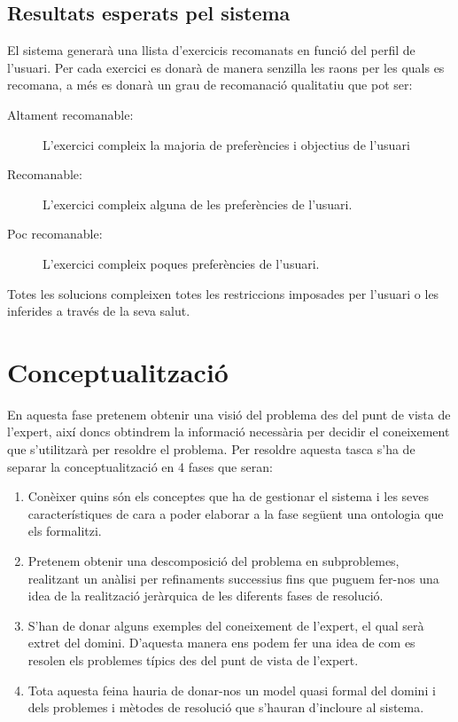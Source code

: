 \documentclass[a4paper, 12pt, UTF8]{article}
\begin{document}
\subsection{Resultats esperats pel sistema}

El sistema generarà una llista d'exercicis recomanats en funció del perfil de l'usuari. Per cada exercici es donarà de manera senzilla les raons per les quals es recomana, a més es donarà un grau de recomanació qualitatiu que pot ser:

\begin{description}
	\item[Altament recomanable:] L'exercici compleix la majoria de preferències i objectius de l'usuari
	\item[Recomanable:] L'exercici compleix alguna de les preferències de l'usuari.
	\item[Poc recomanable:] L'exercici compleix poques preferències de l'usuari.
\end{description}

Totes les solucions compleixen totes les restriccions imposades per l'usuari o les inferides a través de la seva salut.

\section{Conceptualització}

En aquesta fase pretenem obtenir una visió del problema des del punt de vista de l'expert, així doncs obtindrem  la informació necessària per decidir el coneixement que s'utilitzarà per resoldre el problema. Per resoldre aquesta tasca s'ha de separar la conceptualització en 4 fases que seran:

\begin{enumerate}
	\item Conèixer quins són els conceptes que ha de gestionar el sistema i les seves característiques de cara a poder elaborar a la fase següent una ontologia que els formalitzi.
	\item Pretenem obtenir una descomposició del problema en subproblemes, realitzant un anàlisi per refinaments successius fins que puguem fer-nos una idea de la realització jeràrquica de les diferents fases de resolució.
	\item S'han de donar alguns exemples del coneixement de l'expert, el qual serà extret del domini. D'aquesta manera ens podem fer una idea de com es resolen els problemes típics des del punt de vista de l'expert.
	\item Tota aquesta feina hauria de donar-nos un model quasi formal del domini i dels problemes i mètodes de resolució que s'hauran d'incloure al sistema.
\end{enumerate}
\end{document}

